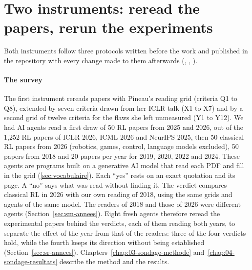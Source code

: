\section{Two instruments: reread the papers, rerun the experiments}\label{sec:intro-instruments}

Both instruments follow three protocols written before the work and published in the repository with
every change made to them afterwards (, ,
).

\paragraph{The survey}
The first instrument rereads papers with Pineau's reading grid (criteria Q1 to Q8), extended by seven
criteria drawn from her ICLR talk (X1 to X7) and by a second grid of twelve criteria for the flaws she
left unmeasured (Y1 to Y12). We had AI agents read a first draw of 50 RL papers from 2025 and 2026, out
of the 1,252 RL papers of ICLR 2026, ICML 2026 and NeurIPS 2025, then 50 classical RL papers from 2026
(robotics, games, control, language models excluded), 50 papers from 2018 and 20 papers per year for
2019, 2020, 2022 and 2024. These agents are programs built on a generative AI model that read each PDF
and fill in the grid (\cref{sec:vocabulaire}). Each \enquote{yes} rests on an exact
quotation and its page. A \enquote{no} says what was read without finding it. The verdict compares classical RL in 2026 with our own reading of 2018, using
the same grids and agents of the same model. The readers of 2018 and those of 2026 were different agents
(Section~\ref{sec:sm-annees}). Eight fresh agents therefore reread the experimental papers behind the
verdicts, each of them reading both years, to separate the effect of the year from that of the readers: three of the four verdicts hold, while the fourth keeps its direction without being established (Section~\ref{sec:sr-annees}).
Chapters~\ref{chap:03-sondage-methode}
and~\ref{chap:04-sondage-resultats} describe the method and the results.

